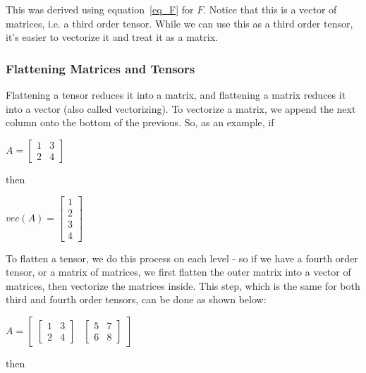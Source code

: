 \documentclass[twocolumn,10pt]{asme2ej}
\begin{document}
This was derived using equation~\ref{eq_F} for $F$. Notice that this is a vector of matrices, i.e. a third order tensor. While we can use this as a third order tensor, it's easier to vectorize it and treat it as a matrix.

\subsubsection{Flattening Matrices and Tensors}

Flattening a tensor reduces it into a matrix, and flattening a matrix reduces it into a vector (also called vectorizing). To vectorize a matrix, we append the next column onto the bottom of the previous. So, as an example, if

\bigskip
\begin{center}
$A = \begin{bmatrix} 1 & 3 \\ 2 & 4 \end{bmatrix}$
\end{center}

then

\begin{center}
$vec(A) = \begin{bmatrix} 1 \\ 2 \\ 3 \\ 4 \end{bmatrix}$
\end{center}

To flatten a tensor, we do this process on each level - so if we have a fourth order tensor, or a matrix of matrices, we first flatten the outer matrix into a vector of matrices, then vectorize the matrices inside. This step, which is the same for both third and fourth order tensors, can be done as shown below:

\bigskip
\begin{center}
$A = \begin{bmatrix} \begin{bmatrix} 1 & 3 \\ 2 & 4 \end{bmatrix} & \begin{bmatrix} 5 & 7 \\ 6 & 8 \end{bmatrix} \end{bmatrix}$
\end{center}

then
\end{document}
